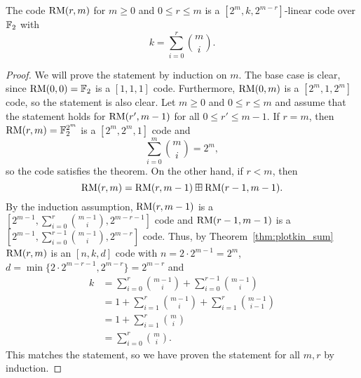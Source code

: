 \documentclass[../main.tex]{subfiles}
\begin{document}
\begin{theorem}
The code $\operatorname{RM}(r, m)$ for $m \geq 0$ and $0 \leq r \leq m$ is a $[2^m, k, 2^{m - r}]$-linear code over $\mathbb{F}_2$ with
\begin{equation*}
    k = \sum_{i=0}^r \binom{m}{i}.
\end{equation*}
\end{theorem}

\begin{proof}
We will prove the statement by induction on $m$. The base case is clear, since $\operatorname{RM}(0, 0) = \mathbb{F}_2$ is a $[1, 1, 1]$ code. Furthermore, $\operatorname{RM}(0, m)$ is a $[2^m, 1, 2^m]$ code, so the statement is also clear. Let $m \geq 0$ and $0 \leq r \leq m$ and assume that the statement holds for $\operatorname{RM}(r', m - 1)$ for all $0 \leq r' \leq m - 1$. If $r = m$, then $\operatorname{RM}(r, m) = \mathbb{F}_2^{2^m}$ is a $[2^m, 2^m, 1]$ code and
\begin{equation*}
    \sum_{i=0}^m \binom{m}{i} = 2^m,
\end{equation*}
so the code satisfies the theorem. On the other hand, if $r < m$, then
\begin{equation*}
    \operatorname{RM}(r, m) = \operatorname{RM}(r, m - 1) \boxplus \operatorname{RM}(r - 1, m - 1).
\end{equation*}
By the induction assumption, $\operatorname{RM}(r, m - 1)$ is a $[2^{m - 1}, \sum_{i=0}^r \binom{m - 1}{i}, 2^{m - r - 1}]$ code and $\operatorname{RM}(r - 1, m - 1)$ is a $[2^{m-1}, \sum_{i=0}^{r-1} \binom{m - 1}{i}, 2^{m - r}]$ code. Thus, by Theorem~\ref{thm:plotkin_sum} $\operatorname{RM}(r, m)$ is an $[n, k, d]$ code with $n = 2 \cdot 2^{m - 1} = 2^m$, $d = \min\{2\cdot 2^{m - r - 1}, 2^{m - r}\} = 2^{m - r}$ and
\begin{align*}
    k &= \sum_{i=0}^r \binom{m - 1}{i} + \sum_{i=0}^{r-1} \binom{m - 1}{i} \\
    &= 1 + \sum_{i=1}^r \binom{m - 1}{i} + \sum_{i=1}^r \binom{m - 1}{i - 1} \\
    &= 1 + \sum_{i=1}^r \binom{m}{i} \\
    &= \sum_{i=0}^r \binom{m}{i}.
\end{align*}
This matches the statement, so we have proven the statement for all $m, r$ by induction.
\end{proof}
\end{document}
